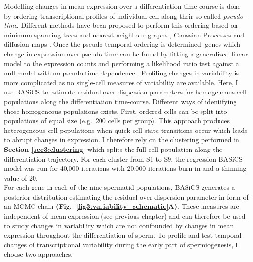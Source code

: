 Modelling changes in mean expression over a differentiation time-course is done by ordering transcriptional profiles of individual cell along their so called \emph{pseudo-time}. Different methods have been proposed to perform this ordering based on minimum spanning trees \citep{Trapnell2014} and nearest-neighbour graphs \cite{Setty2016}, Gaussian Processes \citep{Reid2016a, Campbell2016b} and diffusion maps \citep{Haghverdi2016}. Once the pseudo-temporal ordering is determined, genes which change in expression over pseudo-time can be found by fitting a generalized linear model to the expression counts and performing a likelihood ratio test against a null model with no pseudo-time dependence \citep{Trapnell2014}. Profiling changes in variability is more complicated as no single-cell measures of variability are available. Here, I use BASiCS to estimate residual over-dispersion parameters for homogeneous cell populations along the differentiation time-course. Different ways of identifying those homogeneous populations exists. First, ordered cells can be split into populations of equal size (e.g.~200 cells per group). This approach produces heterogeneous cell populations when quick cell state transitions occur which leads to abrupt changes in expression. I therefore rely on the clustering performed in \textbf{Section \ref{sec3:clustering}} which splits the full cell population along the differentiation trajectory. For each cluster from S1 to S9, the regression BASiCS model was run for 40,000 iterations with 20,000 iterations burn-in and a thinning value of 20. \\

For each gene in each of the nine spermatid populations, BASiCS generates a posterior distribution estimating the residual over-dispersion parameter in form of an MCMC chain \textbf{(Fig.~\ref{fig3:variability_schematic}A)}. These measures are independent of mean expression (see previous chapter) and can therefore be used to study changes in variability which are not confounded by changes in mean expression throughout the differentiation of sperm. To profile and test temporal changes of transcriptional variability during the early part of spermiogenesis, I choose two approaches. \\

